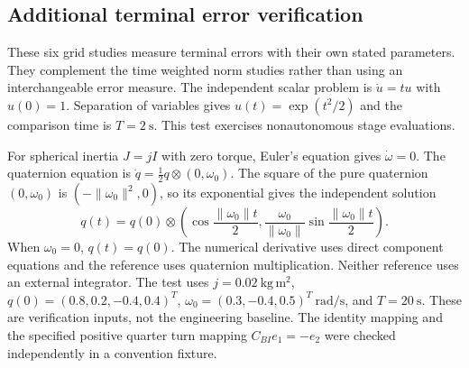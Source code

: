 \subsection{Additional terminal error verification}
These six grid studies measure terminal errors with their own stated
parameters. They complement the time weighted norm studies rather than
using an interchangeable error measure.
The independent scalar problem is $\dot u=tu$ with $u(0)=1$.
Separation of variables gives $u(t)=\exp(t^2/2)$ and the comparison time is
$T=2\ \mathrm{s}$. This test exercises nonautonomous stage evaluations.

For spherical inertia $J=jI$ with zero torque, Euler's equation gives
$\dot\omega=0$. The quaternion equation is
$\dot q=\tfrac12 q\otimes(0,\omega_0)$.
The square of the pure quaternion $(0,\omega_0)$ is
$(-\|\omega_0\|^2,0)$, so its exponential gives the independent solution
\[
q(t)=q(0)\otimes
\left(\cos\frac{\|\omega_0\|t}{2},
\frac{\omega_0}{\|\omega_0\|}\sin\frac{\|\omega_0\|t}{2}\right).
\]
When $\omega_0=0$, $q(t)=q(0)$. The numerical derivative uses direct component
equations and the reference uses quaternion multiplication. Neither reference
uses an external integrator. The test uses $j=0.02\ \mathrm{kg\,m^2}$,
$q(0)=(0.8,0.2,-0.4,0.4)^T$,
$\omega_0=(0.3,-0.4,0.5)^T\ \mathrm{rad/s}$, and $T=20\ \mathrm{s}$.
These are verification inputs, not the engineering baseline.
The identity mapping and the specified positive quarter turn mapping
$C_{BI}e_1=-e_2$ were checked independently in a convention fixture.

